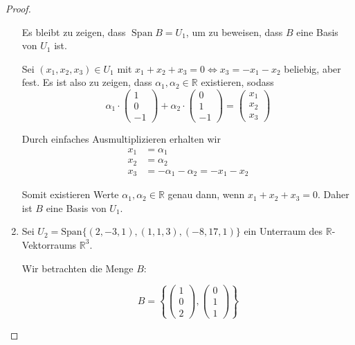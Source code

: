 \documentclass{../problemset}
\begin{document}
\begin{problem}
\begin{proof}
\begin{enumerate}
		      Es bleibt zu zeigen, dass $\operatorname{Span} B = U_1$, um zu beweisen, dass $B$ eine Basis von $U_1$ ist.

		      Sei $(x_1, x_2, x_3) \in U_1$ mit $x_1 + x_2 + x_3 = 0 \Leftrightarrow x_3 = - x_1 - x_2$ beliebig, aber fest. Es ist also zu zeigen, dass $\alpha_1, \alpha_2 \in \mathbb{R}$ existieren, sodass
		      \[
			      \alpha_1 \cdot \begin{pmatrix}
				      1 \\
				      0 \\
				      -1
			      \end{pmatrix} + \alpha_2 \cdot \begin{pmatrix}
				      0 \\
				      1 \\
				      -1
			      \end{pmatrix} = \begin{pmatrix}
				      x_1 \\
				      x_2 \\
				      x_3
			      \end{pmatrix}
		      \]

		      Durch einfaches Ausmultiplizieren erhalten wir
		      \begin{align*}
			      x_1 & = \alpha_1                                             \\
			      x_2 & = \alpha_2                                             \\
			      x_3 & = - \alpha_1 - \alpha_2 = - x_1 - x_2 \tag{\checkmark}
		      \end{align*}

		      Somit existieren Werte $\alpha_1, \alpha_2 \in \mathbb{R}$ genau dann, wenn $x_1 + x_2 + x_3 = 0$. Daher ist $B$ eine Basis von $U_1$.
		\item Sei $U_2 = \text{Span}\{(2, -3, 1), (1, 1, 3), (-8, 17, 1)\}$ ein Unterraum des $\mathbb{R}$-Vektorraums $\mathbb{R}^3$.

		      Wir betrachten die Menge $B$:

		      \[
			      B = \left\{
			      \begin{pmatrix}
				      1 \\ 0 \\ 2
			      \end{pmatrix},
			      \begin{pmatrix}
				      0 \\ 1 \\ 1
			      \end{pmatrix}
			      \right\}
		      \]


\end{enumerate}
\end{proof}
\end{problem}
\end{document}
